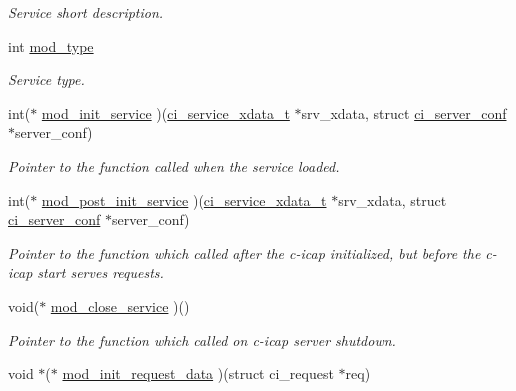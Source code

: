 \begin{DoxyCompactItemize}
\begin{DoxyCompactList}\small\item\em Service short description. \item\end{DoxyCompactList}\item 
int \hyperlink{structci__service__module_a0d5dacfa1b760c7fab9dce70ce8d2703}{mod\_\-type}
\begin{DoxyCompactList}\small\item\em Service type. \item\end{DoxyCompactList}\item 
int($\ast$ \hyperlink{structci__service__module_acf9f56283f9418715be2f87967928876}{mod\_\-init\_\-service} )(\hyperlink{group__SERVICES_ga033e7bb0a88b3619abbc17230ad98eb4}{ci\_\-service\_\-xdata\_\-t} $\ast$srv\_\-xdata, struct \hyperlink{structci__server__conf}{ci\_\-server\_\-conf} $\ast$server\_\-conf)
\begin{DoxyCompactList}\small\item\em Pointer to the function called when the service loaded. \item\end{DoxyCompactList}\item 
int($\ast$ \hyperlink{structci__service__module_a3975fa968c80e30d77f3f1bac100e9e1}{mod\_\-post\_\-init\_\-service} )(\hyperlink{group__SERVICES_ga033e7bb0a88b3619abbc17230ad98eb4}{ci\_\-service\_\-xdata\_\-t} $\ast$srv\_\-xdata, struct \hyperlink{structci__server__conf}{ci\_\-server\_\-conf} $\ast$server\_\-conf)
\begin{DoxyCompactList}\small\item\em Pointer to the function which called after the c-\/icap initialized, but before the c-\/icap start serves requests. \item\end{DoxyCompactList}\item 
void($\ast$ \hyperlink{structci__service__module_a6ecb3941f63aed5ae248db8a679d69ae}{mod\_\-close\_\-service} )()
\begin{DoxyCompactList}\small\item\em Pointer to the function which called on c-\/icap server shutdown. \item\end{DoxyCompactList}\item 
void $\ast$($\ast$ \hyperlink{structci__service__module_a0ab686479bbf157f12c5913efd396c96}{mod\_\-init\_\-request\_\-data} )(struct ci\_\-request $\ast$req)

\end{DoxyCompactItemize}
